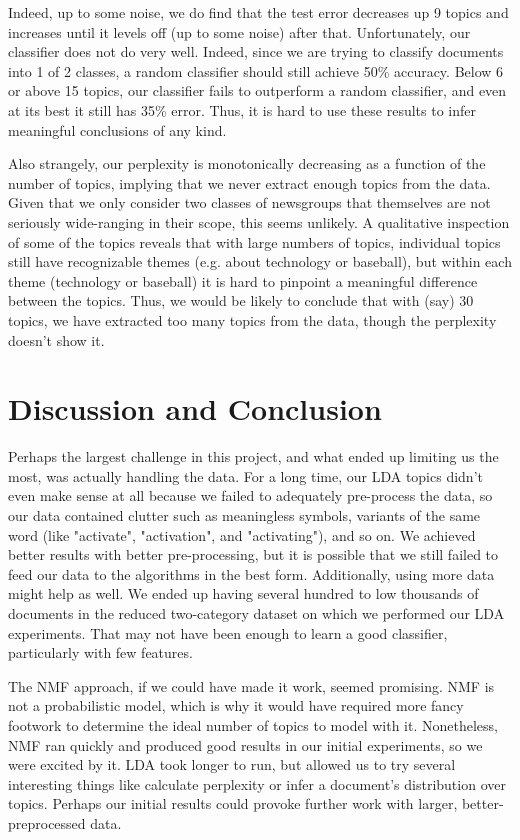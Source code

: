 \documentclass[10pt]{article}
\begin{document}
Indeed, up to some noise, we do find that the test error decreases up 9 topics and increases until it levels off (up to some noise) after that.  Unfortunately, our classifier does not do very well.  Indeed, since we are trying to classify documents into 1 of 2 classes, a random classifier should still achieve 50\% accuracy.  Below 6 or above 15 topics, our classifier fails to outperform a random classifier, and even at its best it still has 35\% error.  Thus, it is hard to use these results to infer meaningful conclusions of any kind.  

Also strangely, our perplexity is monotonically decreasing as a function of the number of topics, implying that we never extract enough topics from the data.  Given that we only consider two classes of newsgroups that themselves are not seriously wide-ranging in their scope, this seems unlikely.  A qualitative inspection of some of the topics reveals that with large numbers of topics, individual topics still have recognizable themes (e.g. about technology or baseball), but within each theme (technology or baseball) it is hard to pinpoint a meaningful difference between the topics.  Thus, we would be likely to conclude that with (say) 30 topics, we have extracted too many topics from the data, though the perplexity doesn't show it.  
\section{Discussion and Conclusion}
Perhaps the largest challenge in this project, and what ended up limiting us the most, was actually handling the data.  For a long time, our LDA topics didn't even make sense at all because we failed to adequately pre-process the data, so our data contained clutter such as meaningless symbols, variants of the same word (like "activate", "activation", and "activating"), and so on.  We achieved better results with better pre-processing, but it is possible that we still failed to feed our data to the algorithms in the best form.  Additionally, using more data might help as well.  We ended up having several hundred to low thousands of documents in the reduced two-category dataset on which we performed our LDA experiments.  That may not have been enough to learn a good classifier, particularly with few features.  

The NMF approach, if we could have made it work, seemed promising.  NMF is not a probabilistic model, which is why it would have required more fancy footwork to determine the ideal number of topics to model with it. Nonetheless, NMF ran quickly and produced good results in our initial experiments, so we were excited by it.  LDA took longer to run, but allowed us to try several interesting things like calculate perplexity or infer a document's distribution over topics.  Perhaps our initial results could provoke further work with larger, better-preprocessed data. 



\end{document}

